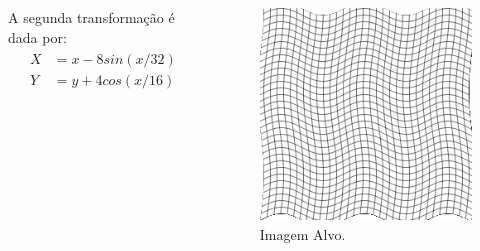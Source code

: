 \documentclass[t]{beamer}
\begin{document}
\begin{frame}
   \begin{columns}[c]
        A segunda transformação é dada por:
        \begin{align}
        \begin{split}
            X &= x - 8sin(x/32) \\
            Y &= y + 4cos(x/16)
        \end{split} 
        \end{align}
        \begin{figure}[!h]
          \begin{center}
            \includegraphics[width=1.0\textwidth]{../images/gridSin.png}
            \caption{Imagem Alvo.}
          \end{center}
        \end{figure}
    \end{columns}
\end{frame}
\end{document}
